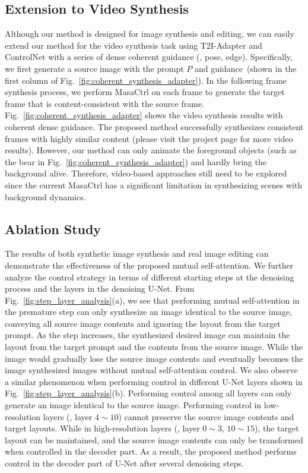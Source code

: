 \documentclass[10pt,twocolumn,letterpaper]{article}
\begin{document}
\subsection{Extension to Video Synthesis}
Although our method is designed for image synthesis and editing,
we can easily extend our method for the video synthesis task using T2I-Adapter and ControlNet with a series of dense coherent guidance (\eg, pose, edge). Specifically, we first generate a source image with the prompt $P$ and guidance~(shown in the first column of Fig.~\ref{fig:coherent_synthesis_adapter}). In the following frame synthesis process, we perform MasaCtrl on each frame to generate the target frame that is content-consistent with the source frame. Fig.~\ref{fig:coherent_synthesis_adapter} shows the video synthesis results with coherent dense guidance. The proposed method successfully synthesizes consistent frames with highly similar content (please visit the project page for more video results). However, our method can only animate the foreground objects (such as the bear in Fig.~\ref{fig:coherent_synthesis_adapter}) and hardly bring the background alive. Therefore, video-based approaches still need to be explored since the current MasaCtrl has a significant limitation in synthesizing scenes with background dynamics.


\subsection{Ablation Study}\label{sec:ablation_study}
The results of both synthetic image synthesis and real image editing can demonstrate the effectiveness of the proposed mutual self-attention. We further analyze the control strategy in terms of different starting steps at the denoising process and the layers in the denoising U-Net. From Fig.~\ref{fig:step_layer_analysis}(a), we see that performing mutual self-attention in the premature step can only synthesize an image identical to the source image, conveying all source image contents and ignoring the layout from the target prompt. As the step increases, the synthesized desired image can maintain the layout from the target prompt and the contents from the source image. While the image would gradually lose the source image contents and eventually becomes the image synthesized images without mutual self-attention control. We also observe a similar phenomenon when performing control in different U-Net layers shown in Fig.~\ref{fig:step_layer_analysis}(b). Performing control among all layers can only generate an image identical to the source image. Performing control in low-resolution layers (\eg, layer $4\sim 10$) cannot preserve the source image contents and target layouts. While in high-resolution layers (\eg, layer $0\sim 3$, $10\sim 15$), the target layout can be maintained, and the source image contents can only be transformed when controlled in the decoder part. As a result, the proposed method performs control in the decoder part of U-Net after several denoising steps.
\end{document}

